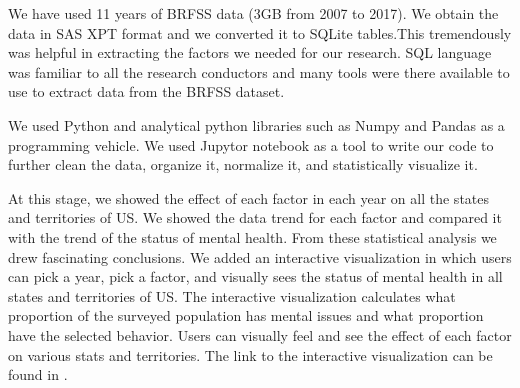 \documentclass[letterpaper, 10 pt, conference]{ieeeconf}  %
\begin{document}



We have used 11 years of BRFSS data (3GB from 2007 to 2017). We obtain the data in
SAS \cite{sas} XPT format and we converted it to SQLite \cite{sqlite} tables.This tremendously was helpful 
in extracting the factors we needed for our research. SQL language was familiar to all the research conductors 
and many tools were there available to use to extract data from the BRFSS dataset.

We used Python and analytical python libraries such as Numpy \cite{numpy} and Pandas \cite{pandas}
as a programming vehicle. We used Jupytor notebook as a tool to write our code to further clean the data,
organize it, normalize it, and statistically visualize it. 

At this stage, we showed the effect of each factor in each year on all the states and territories of US. We showed the data trend for each factor and 
compared it with the trend of the status of mental health. From these statistical analysis we drew fascinating conclusions. 
We added an interactive visualization in which users can pick a year, pick a factor, and 
visually sees the status of mental health in all states and territories of US. The interactive visualization calculates what proportion 
of the surveyed population has mental issues and what proportion have the selected behavior. Users can visually 
feel and see the effect of each factor on various stats and territories. The link to the interactive visualization can be found in \cite{visualization}.
\end{document}
